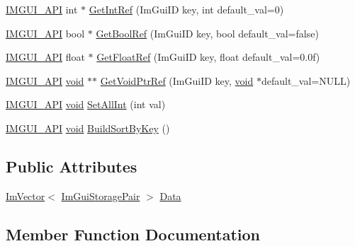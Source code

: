 \begin{DoxyCompactItemize}
\item 
\hyperlink{imgui_8h_a43829975e84e45d1149597467a14bbf5}{I\+M\+G\+U\+I\+\_\+\+A\+PI} int $\ast$ \hyperlink{structImGuiStorage_a28673fa7839263f3066ccb8e93e748a9}{Get\+Int\+Ref} (Im\+Gui\+ID key, int default\+\_\+val=0)
\item 
\hyperlink{imgui_8h_a43829975e84e45d1149597467a14bbf5}{I\+M\+G\+U\+I\+\_\+\+A\+PI} bool $\ast$ \hyperlink{structImGuiStorage_aeb0d62100453d710bac5f6ad0a6e6a2e}{Get\+Bool\+Ref} (Im\+Gui\+ID key, bool default\+\_\+val=false)
\item 
\hyperlink{imgui_8h_a43829975e84e45d1149597467a14bbf5}{I\+M\+G\+U\+I\+\_\+\+A\+PI} float $\ast$ \hyperlink{structImGuiStorage_a4b51cc8c92c65d4224af65a8ce7752ee}{Get\+Float\+Ref} (Im\+Gui\+ID key, float default\+\_\+val=0.\+0f)
\item 
\hyperlink{imgui_8h_a43829975e84e45d1149597467a14bbf5}{I\+M\+G\+U\+I\+\_\+\+A\+PI} \hyperlink{imgui__impl__opengl3__loader_8h_ac668e7cffd9e2e9cfee428b9b2f34fa7}{void} $\ast$$\ast$ \hyperlink{structImGuiStorage_a2b203317f3f488818e9b9f416fe35332}{Get\+Void\+Ptr\+Ref} (Im\+Gui\+ID key, \hyperlink{imgui__impl__opengl3__loader_8h_ac668e7cffd9e2e9cfee428b9b2f34fa7}{void} $\ast$default\+\_\+val=N\+U\+LL)
\item 
\hyperlink{imgui_8h_a43829975e84e45d1149597467a14bbf5}{I\+M\+G\+U\+I\+\_\+\+A\+PI} \hyperlink{imgui__impl__opengl3__loader_8h_ac668e7cffd9e2e9cfee428b9b2f34fa7}{void} \hyperlink{structImGuiStorage_ae5ee60618c4ce8e2b4ce0e5543d52992}{Set\+All\+Int} (int val)
\item 
\hyperlink{imgui_8h_a43829975e84e45d1149597467a14bbf5}{I\+M\+G\+U\+I\+\_\+\+A\+PI} \hyperlink{imgui__impl__opengl3__loader_8h_ac668e7cffd9e2e9cfee428b9b2f34fa7}{void} \hyperlink{structImGuiStorage_a5eae75e98a65c146e99898e359225f99}{Build\+Sort\+By\+Key} ()
\end{DoxyCompactItemize}
\subsection*{Public Attributes}
\begin{DoxyCompactItemize}
\item 
\hyperlink{structImVector}{Im\+Vector}$<$ \hyperlink{structImGuiStorage_1_1ImGuiStoragePair}{Im\+Gui\+Storage\+Pair} $>$ \hyperlink{structImGuiStorage_a632c9d57791b68bfe671c748e9c54bc0}{Data}
\end{DoxyCompactItemize}


\subsection{Member Function Documentation}
\mbox{\label{structImGuiStorage_a5eae75e98a65c146e99898e359225f99}} 
